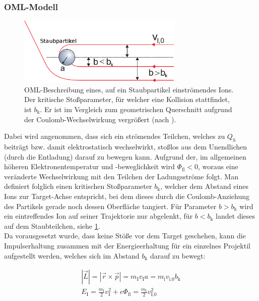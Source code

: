 \documentclass[numbers=noenddot,a4paper]{scrartcl}
\newcommand{\ix}[1]{_\text{#1}}
\begin{document}
			\subsubsection{OML-Modell}\label{subsub:oml}

						\begin{figure}
							\centering
							\includegraphics[width=0.7\textwidth, height=0.3\textwidth]{figs/orbitalmotionlimitmelzer.png}
							\caption{OML-Beschreibung eines, auf ein Staubpartikel einströmendes Ions. Der kritische Stoßparameter, für welcher eine Kollision stattfindet, ist $b\ix{k}$. Er ist im Vergleich zum geometrischen Querschnitt aufgrund der Coulomb-Wechselwirkung vergrößert (nach \cite{Melzer12}).}
							\label{img:oml}
						\end{figure}

			Dabei wird angenommen, dass sich ein strömendes Teilchen, welches zu $Q\ix{S}$ beiträgt bzw. damit elektrostatisch wechselwirkt, stoßlos aus dem Unendlichen (durch die Entladung) darauf zu bewegen kann. Aufgrund der, im allgemeinen höheren Elektronentemperatur und -beweglichkeit wird $\Phi\ix{fl}<0$, woraus eine veränderte Wechselwirkung mit den Teilchen der Ladungsströme folgt. Man definiert folglich einen kritischen Stoßparameter $b\ix{k}$, welcher dem Abstand eines Ions zur Target-Achse entspricht, bei dem dieses durch die Coulomb-Anziehung des Partikels gerade noch dessen Oberfläche tangiert. Für Parameter $b>b\ix{k}$ wird ein eintreffendes Ion auf seiner Trajektorie nur abgelenkt, für $b<b\ix{k}$ landet dieses auf dem Staubteilchen, siehe \ref{img:oml}.\\
			Da vorausgesetzt wurde, dass keine Stöße vor dem Target geschehen, kann die Impulserhaltung zusammen mit der Energieerhaltung für ein einzelnes Projektil aufgestellt werden, welches sich im Abstand $b\ix{k}$ darauf zu bewegt:

				\begin{align}
					|\vec{L}|=|\vec{r}\times\vec{p}|=m\ix{I}v\ix{I}a=m\ix{i}v\ix{i,0}b\ix{k} \label{eq:impulserhaltung} \\
					E\ix{I}=\frac{m\ix{I}}{2}v\ix{I}^2+e\Phi\ix{fl}=\frac{m\ix{I}}{2}v\ix{I,0}^2 \label{eq:energieerhaltung}
				\end{align}
\end{document}
